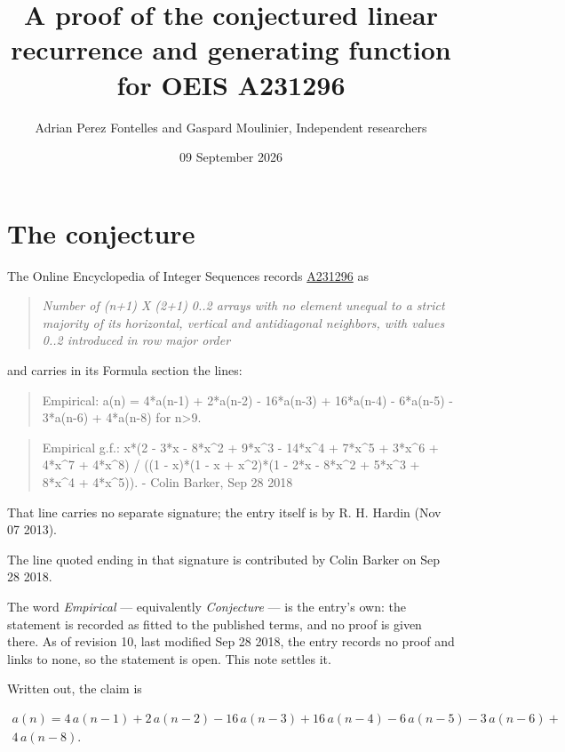 \documentclass[11pt]{article}
\title{A proof of the conjectured linear recurrence and generating function for OEIS A231296}
\author{Adrian Perez Fontelles and Gaspard Moulinier, Independent researchers}
\date{09 September 2026}
\theoremstyle{definition}
\begin{document}
\maketitle
\section{The conjecture}

The Online Encyclopedia of Integer Sequences records \href{https://oeis.org/A231296}{A231296} as

\begin{quote}\itshape Number of (n+1) X (2+1) 0..2 arrays with no element unequal to a strict majority of its horizontal, vertical and antidiagonal neighbors, with values 0..2 introduced in row major order\end{quote}

and carries in its Formula section the lines:

\begin{quote}\ttfamily Empirical: a(n) = 4*a(n-1) + 2*a(n-2) - 16*a(n-3) + 16*a(n-4) - 6*a(n-5) - 3*a(n-6) + 4*a(n-8) for n>9.\end{quote}

\begin{quote}\ttfamily Empirical g.f.: x*(2 - 3*x - 8*x\textasciicircum{}2 + 9*x\textasciicircum{}3 - 14*x\textasciicircum{}4 + 7*x\textasciicircum{}5 + 3*x\textasciicircum{}6 + 4*x\textasciicircum{}7 + 4*x\textasciicircum{}8) / ((1 - x)*(1 - x + x\textasciicircum{}2)*(1 - 2*x - 8*x\textasciicircum{}2 + 5*x\textasciicircum{}3 + 8*x\textasciicircum{}4 + 4*x\textasciicircum{}5)). - Colin Barker, Sep 28 2018\end{quote}

That line carries no separate signature; the entry itself is by R. H. Hardin (Nov 07 2013).

The line quoted ending in that signature is contributed by Colin Barker on Sep 28 2018.

The word {\itshape Empirical} --- equivalently {\itshape Conjecture} --- is the entry's own: the statement is recorded as fitted to the published terms, and no proof is given there. As of revision 10, last modified Sep 28 2018, the entry records no proof and links to none, so the statement is open. This note settles it.

Written out, the claim is

\begin{multline*} a(n) = 4\,a(n-1) + 2\,a(n-2) - 16\,a(n-3) + 16\,a(n-4) - 6\,a(n-5) - 3\,a(n-6) + \\ 4\,a(n-8). \end{multline*}
\end{document}
